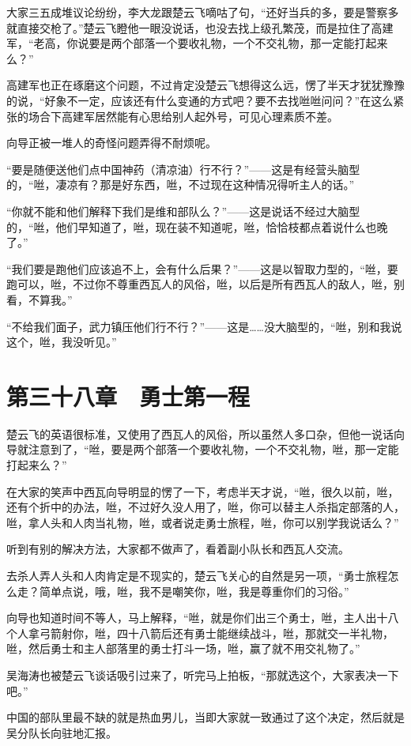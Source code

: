 大家三五成堆议论纷纷，李大龙跟楚云飞嘀咕了句，“还好当兵的多，要是警察多就直接交枪了。”楚云飞瞪他一眼没说话，也没去找上级孔繁茂，而是拉住了高建军，“老高，你说要是两个部落一个要收礼物，一个不交礼物，那一定能打起来么？”

高建军也正在琢磨这个问题，不过肯定没楚云飞想得这么远，愣了半天才犹犹豫豫的说，“好象不一定，应该还有什么变通的方式吧？要不去找咝咝问问？”在这么紧张的场合下高建军居然能有心思给别人起外号，可见心理素质不差。

向导正被一堆人的奇怪问题弄得不耐烦呢。

“要是随便送他们点中国神药（清凉油）行不行？”——这是有经营头脑型的，“咝，凄凉有？那是好东西，咝，不过现在这种情况得听主人的话。”

“你就不能和他们解释下我们是维和部队么？”——这是说话不经过大脑型的，“咝，他们早知道了，咝，现在装不知道呢，咝，恰恰枝都点着说什么也晚了。”

“我们要是跑他们应该追不上，会有什么后果？”——这是以智取力型的，“咝，要跑可以，咝，不过你不尊重西瓦人的风俗，咝，以后是所有西瓦人的敌人，咝，别看，不算我。”

“不给我们面子，武力镇压他们行不行？”——这是……没大脑型的，“咝，别和我说这个，咝，我没听见。”

\section{第三十八章　勇士第一程}

楚云飞的英语很标准，又使用了西瓦人的风俗，所以虽然人多口杂，但他一说话向导就注意到了，“咝，要是两个部落一个要收礼物，一个不交礼物，咝，那一定能打起来么？”

在大家的笑声中西瓦向导明显的愣了一下，考虑半天才说，“咝，很久以前，咝，还有个折中的办法，咝，不过好久没人用了，咝，你可以替主人杀指定部落的人，咝，拿人头和人肉当礼物，咝，或者说走勇士旅程，咝，你可以别学我说话么？”

听到有别的解决方法，大家都不做声了，看着副小队长和西瓦人交流。

去杀人弄人头和人肉肯定是不现实的，楚云飞关心的自然是另一项，“勇士旅程怎么走？简单点说，哦，咝，我不是嘲笑你，咝，我是尊重你们的习俗。”

向导也知道时间不等人，马上解释，“咝，就是你们出三个勇士，咝，主人出十八个人拿弓箭射你，咝，四十八箭后还有勇士能继续战斗，咝，那就交一半礼物，咝，然后勇士和主人部落里的勇士打斗一场，咝，赢了就不用交礼物了。”

吴海涛也被楚云飞谈话吸引过来了，听完马上拍板，“那就选这个，大家表决一下吧。”

中国的部队里最不缺的就是热血男儿，当即大家就一致通过了这个决定，然后就是吴分队长向驻地汇报。

